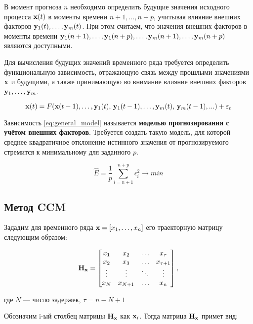\documentclass[a4paper]{article}
\begin{document}
В момент прогноза $n$ необходимо определить будущие значения исходного процесса $\mathbf{x}(t)$ в моменты времени $n+1, \ldots, n+p$, учитывая влияние внешних факторов $\mathbf{y}_1(t), \ldots, \mathbf{y}_m(t)$. При этом считаем, что значения внешних факторов в моменты времени $\mathbf{y}_1(n+1), \ldots, \mathbf{y}_1(n+p), \ldots, \mathbf{y}_m(n+1), \ldots, \mathbf{y}_m(n+p)$ являются доступными.

Для вычисления будущих значений временного ряда требуется определить функциональную зависимость, отражающую связь между прошлыми значениями $\mathbf{x}$ и будущими, а также принимающую во внимание влияние внешних факторов $\mathbf{y}_1, \ldots, \mathbf{y}_m$.

\begin{equation} \label{eq:general_model}
	\mathbf{x}(t) = F(\mathbf{x}(t-1), \ldots, \mathbf{y}_1(t), \, \mathbf{y}_1(t-1), \ldots, \mathbf{y}_m(t), \, \mathbf{y}_m(t-1), ...) + \varepsilon_t
\end{equation}

Зависимость \eqref{eq:general_model} называется \textbf{моделью прогнозирования с учётом внешних факторов}.
Требуется создать такую модель, для которой среднее квадратичное отклонение истинного значения от прогнозируемого стремится к минимальному для заданного $p$. 

\begin{equation} \label{eq:model_error}
	\hat{E} = \dfrac{1}{p} \sum\limits_{i=n+1}^{n+p} \epsilon_i^2 \rightarrow min
\end{equation}

\subsection{Метод CCM}
Зададим для временного ряда $\mathbf{x} = [x_1, \ldots, x_n]$ его траекторную матрицу следующим образом: 

\begin{equation*} \label{eq:traj_mat}
	\mathbf{H}_{\mathbf{x}} = \begin{bmatrix}
		x_1 & x_2 & \ldots & x_{\tau} \\
		x_2 & x_3 & \ldots & x_{\tau+1} \\
		\vdots & \vdots & \ddots & \vdots \\
		x_{N} & x_{N+1} & \ldots & x_n
	\end{bmatrix}, 
\end{equation*} 

где $N$ --- число задержек, $\tau = n - N + 1$

Обозначим i-ый столбец матрицы $\mathbf{H}_{\mathbf{x}}$ как $\mathbf{x}_i$. 
Тогда матрица $\mathbf{H}_{\mathbf{x}}$ примет вид:
\end{document}
